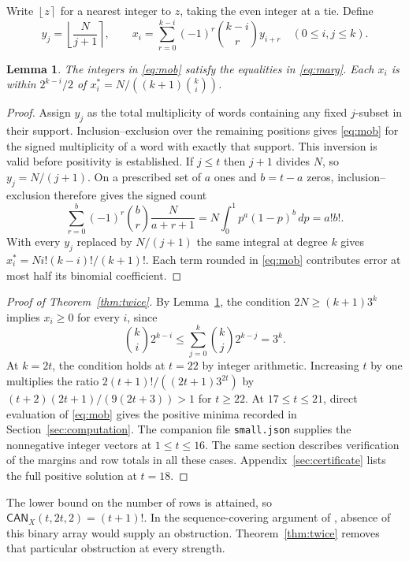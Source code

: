 \documentclass[11pt]{article}
\newtheorem{lemma}[theorem]{Lemma}
\newcommand{\nint}[1]{\left\lfloor #1\right\rceil}
\newcommand{\code}[1]{\texttt{#1}}
\begin{document}
Write $\nint{z}$ for a nearest integer to $z$, taking the even integer
at a tie. Define
\begin{equation}
 y_j=\nint{\frac{N}{j+1}},\qquad
 x_i=\sum_{r=0}^{k-i}(-1)^r\binom{k-i}{r}y_{i+r}
 \quad(0\le i,j\le k).                                           \label{eq:mob}
\end{equation}
\begin{lemma}\label{lem:rounding}
The integers in \eqref{eq:mob} satisfy the equalities in
\eqref{eq:marg}. Each $x_i$ is within $2^{k-i}/2$ of
$x_i^*=N/((k+1)\binom{k}{i})$.
\end{lemma}
\begin{proof}
Assign $y_j$ as the total multiplicity of words containing any fixed
$j$-subset in their support. Inclusion--exclusion over the remaining
positions gives \eqref{eq:mob} for the signed multiplicity of a word
with exactly that support. This inversion is valid before positivity
is established. If $j\le t$ then $j+1$ divides $N$, so $y_j=N/(j+1)$.
On a prescribed set of $a$ ones and $b=t-a$ zeros, inclusion--exclusion
therefore gives the signed count
\[
 \sum_{r=0}^{b}(-1)^r\binom{b}{r}\frac{N}{a+r+1}
 = N\int_0^1 p^a(1-p)^b\,dp
 = a!b!.
\]
With every $y_j$ replaced by $N/(j+1)$ the same integral at degree $k$
gives $x_i^*=N i!(k-i)!/(k+1)!$. Each term rounded in \eqref{eq:mob}
contributes error at most half its binomial coefficient.
\end{proof}

\begin{proof}[Proof of Theorem~\ref{thm:twice}]
By Lemma~\ref{lem:rounding}, the condition \(2N\ge(k+1)3^k\) implies
\(x_i\ge0\) for every \(i\), since
\[
  \binom{k}{i}2^{k-i}\le\sum_{j=0}^k\binom{k}{j}2^{k-j}=3^k .
\]
At \(k=2t\), the condition holds at \(t=22\) by integer arithmetic.
Increasing \(t\) by one multiplies the ratio
\(2(t+1)!/((2t+1)3^{2t})\) by
\((t+2)(2t+1)/(9(2t+3))>1\) for \(t\ge22\).
At \(17\le t\le21\), direct evaluation of \eqref{eq:mob} gives the
positive minima recorded in Section~\ref{sec:computation}.
The companion file \code{small.json} supplies the nonnegative integer
vectors at \(1\le t\le16\). The same section describes verification
of the margins and row totals in all these cases. Appendix~\ref{sec:certificate}
lists the full positive solution at \(t=18\).
\end{proof}

The lower bound on the number of rows is attained, so
\(\mathsf{CAN}_X(t,2t,2)=(t+1)!\). In the sequence-covering argument of
\cite[Section~5]{ghw}, absence of this binary array would supply an
obstruction. Theorem~\ref{thm:twice} removes that particular obstruction
at every strength.
\end{document}
